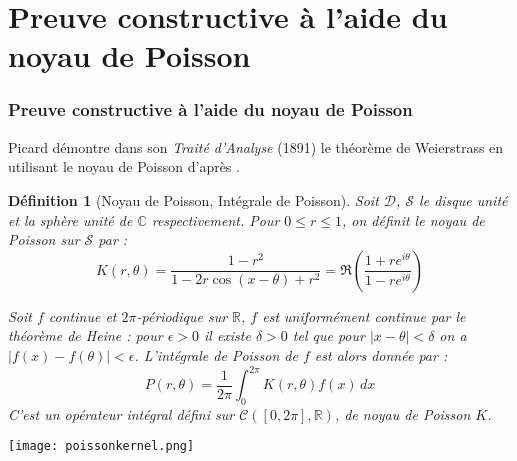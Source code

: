 \documentclass[
	10pt, %
	xcolor={svgnames}
]{beamer}
\newtheorem{defi}[subsubsection]{Définition}
\begin{document}
\section{Preuve constructive à l'aide du noyau de Poisson}
\begin{frame}
\frametitle{Preuve constructive à l'aide du noyau de Poisson}

Picard démontre dans son \textit{Traité d'Analyse} (1891) le théorème de Weierstrass en utilisant le noyau de Poisson d'après \cite[p.~19-22]{pinkus2000approximation}.
 
\begin{defi}[Noyau de Poisson, Intégrale de Poisson]
	Soit \( \mathcal{D} \), \( \mathcal{S} \) le disque unité et la sphère unité de \( \mathbb{C} \) respectivement. Pour \( 0 \leq r \leq 1 \), on définit le noyau de Poisson sur \( \mathcal{S} \) par :
\begin{equation*}
	K(r,\theta) = \frac{1 - r^{2}}{1-2r\cos(x-\theta)+r^{2}} = \Re(\frac{1 + re^{i\theta}}{1 - re^{i\theta}})
\end{equation*}

Soit \( f \) continue et \( 2\pi\)-périodique sur \( \mathbb{R} \), \( f \) est uniformément continue par le théorème de Heine : pour \( \epsilon > 0 \) il existe \( \delta > 0 \) tel que pour \( {\left\lvert x - \theta \right\rvert} < \delta \) on a \( {\left\lvert f(x) - f(\theta) \right\rvert} < \epsilon \). L'intégrale de Poisson de \( f \) est alors donnée par :
\begin{equation*}
	P(r,\theta) = \frac{1}{2\pi} \int_0^{2\pi} 
	K(r,\theta) f(x) \, dx
\end{equation*}
C'est un opérateur intégral défini sur \( \mathcal{C}([0,2\pi],\mathbb{R}) \), de noyau de Poisson \( K \). \nocite{pinkus2000approximation}

	\end{defi}
\end{frame}

\begin{frame}
	\center\texttt{[image: poissonkernel.png]}
\end{frame}
\end{document}
